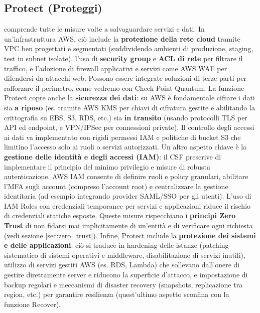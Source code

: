 \documentclass[a4paper,12pt]{report}
\begin{document}
\subsection{Protect (Proteggi)}
\label{subsec:nist_csf_protect}
comprende tutte le misure volte a salvaguardare servizi e dati. In un'infrastruttura AWS, ciò include la \textbf{protezione della rete cloud} tramite VPC ben progettati e segmentati (suddividendo ambienti di produzione, staging, test in subnet isolate), l'uso di \textbf{security group} e \textbf{ACL di rete} per filtrare il traffico, e l'adozione di firewall applicativi e servizi come AWS WAF per difendersi da attacchi web. Possono essere integrate soluzioni di terze parti per rafforzare il perimetro, come vedremo con Check Point Quantum. La funzione Protect copre anche la \textbf{sicurezza dei dati}: su AWS è fondamentale cifrare i dati sia \textbf{a riposo} (es. tramite AWS KMS per chiavi di cifratura gestite e abilitando la crittografia su EBS, S3, RDS, etc.) sia \textbf{in transito} (usando protocolli TLS per API ed endpoint, e VPN/IPSec per connessioni private). Il controllo degli accessi ai dati va implementato con rigidi permessi IAM e politiche di bucket S3 che limitino l'accesso solo ai ruoli o servizi autorizzati. Un altro aspetto chiave è la \textbf{gestione delle identità e degli accessi (IAM)}: il CSF prescrive di implementare il principio del minimo privilegio e misure di robusta autenticazione. AWS IAM consente di definire ruoli e policy granulari, abilitare l'MFA sugli account (compreso l'account root) e centralizzare la gestione identitaria (ad esempio integrando provider SAML/SSO per gli utenti). L'uso di IAM Roles con credenziali temporanee per servizi e applicazioni riduce il rischio di credenziali statiche esposte. Queste misure rispecchiano i \textbf{principi Zero Trust} di non fidarsi mai implicitamente di un'entità e di verificare ogni richiesta (vedi sezione \ref{sec:zero_trust}). Infine, Protect include la \textbf{protezione dei sistemi e delle applicazioni}: ciò si traduce in hardening delle istanze (patching sistematico di sistemi operativi e middleware, disabilitazione di servizi inutili), utilizzo di servizi gestiti AWS (es. RDS, Lambda) che sollevano dall'onere di gestire direttamente server e riducono la superficie d'attacco, e impostazione di backup regolari e meccanismi di disaster recovery (snapshots, replicazione tra region, etc.) per garantire resilienza (quest'ultimo aspetto sconfina con la funzione Recover).
\end{document}
